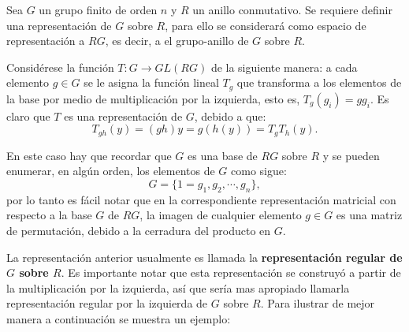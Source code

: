 \begin{ejemplo}
Sea $G$ un grupo finito de orden $n$ y $R$ un anillo conmutativo. Se requiere definir una representación de $G$ sobre $R$, para ello se considerará  como espacio de representación a $RG$, es decir, a el grupo-anillo de $G$ sobre $R$. 

Considérese la función $T \colon G \to GL(RG)$ de la siguiente manera: a cada elemento $g \in G$ se le asigna la función lineal $T_g$ que transforma a los elementos de la base por medio de multiplicación por la izquierda, esto es, $T_g(g_i) = gg_i$. Es claro que $T$ es una representación de $G$, debido a que:
\begin{equation*} T_{gh}(y) = (gh)y = g(h(y)) = T_gT_h(y).  \end{equation*}

 
En este caso hay que recordar que $G$ es una base de $RG$ sobre $R$ y se pueden enumerar, en algún orden, los elementos de $G$ como sigue:
\begin{equation*} 
G = \{ 1=g_1, g_2, \cdots, g_n \}, 
\end{equation*}  por lo tanto es fácil notar que en la correspondiente representación matricial con respecto a la base $G$ de $RG$, la imagen de cualquier elemento $g \in G$ es una matriz de permutación, debido a la cerradura del producto en $G$. 
\end{ejemplo}
La representación anterior usualmente es llamada la \textbf{representación regular de $G$ sobre $R$}. Es importante notar que esta representación se construyó a partir de la multiplicación por la izquierda, así que sería mas apropiado llamarla representación regular por la izquierda de $G$ sobre $R$. Para ilustrar de mejor manera a continuación se muestra un ejemplo:


